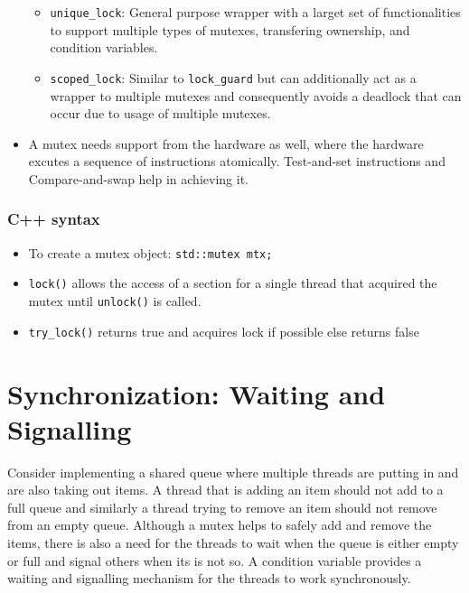 \documentclass{scrartcl}
\begin{document}
\begin{itemize}
\begin{itemize}
	\item \texttt{unique_lock}: General purpose wrapper with a larget set of functionalities to support multiple types of mutexes, transfering ownership, and condition variables.
	\item \texttt{scoped_lock}: Similar to \texttt{lock_guard} but can additionally act as a wrapper to multiple mutexes and consequently avoids a deadlock that can occur due to usage of multiple mutexes.
	\end{itemize}
\item A mutex needs support from the hardware as well, where the hardware excutes a sequence of instructions atomically. Test-and-set instructions and Compare-and-swap help in achieving it.
\end{itemize}


\subsubsection{C++ syntax}
\begin{itemize}
    \item To create a mutex object: \texttt{std::mutex mtx;}
    \item \texttt{lock()} allows the access of a section for a single thread that acquired the mutex until \texttt{unlock()} is called.
    \item \texttt{try_lock()} returns true and acquires lock if possible else returns false
    
\end{itemize}

\section{Synchronization: Waiting and Signalling}
Consider implementing a shared queue where multiple threads are putting in and are also taking out items. A thread that is adding an item should not add to a full queue and similarly a thread trying to remove an item should not remove from an empty queue. Although a mutex helps to safely add and remove the items, there is also a need for the threads to wait when the queue is either empty or full and signal others when its is not so. A condition variable provides a waiting and signalling mechanism for the threads to work synchronously.
\end{document}

